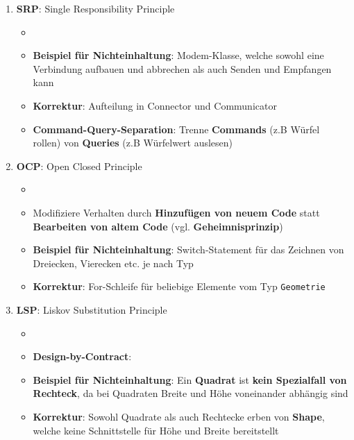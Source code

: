 \begin{enumerate}
	\item \textbf{SRP}: Single Responsibility Principle
	\begin{itemize}
		\item {}
		\item \textbf{Beispiel für Nichteinhaltung}: Modem-Klasse, welche sowohl eine Verbindung aufbauen und abbrechen als auch Senden und Empfangen kann
		\item \textbf{Korrektur}: Aufteilung in Connector und Communicator
		\item \textbf{Command-Query-Separation}: Trenne \textbf{Commands} (z.B Würfel rollen) von \textbf{Queries} (z.B Würfelwert auslesen)
	\end{itemize}
	\item \textbf{OCP}: Open Closed Principle
	\begin{itemize}
		\item {}
		\item Modifiziere Verhalten durch \textbf{Hinzufügen von neuem Code} statt \textbf{Bearbeiten von altem Code} (vgl. \textbf{Geheimnisprinzip})
		\item \textbf{Beispiel für Nichteinhaltung}: Switch-Statement für das Zeichnen von Dreiecken, Vierecken etc. je nach Typ
		\item \textbf{Korrektur}: For-Schleife für beliebige Elemente vom Typ \texttt{Geometrie}
	\end{itemize}
	\item \textbf{LSP}: Liskov Substitution Principle
	\begin{itemize}
		\item {}
		\item \textbf{Design-by-Contract}: 
		\item \textbf{Beispiel für Nichteinhaltung}: Ein \textbf{Quadrat} ist \textbf{kein Spezialfall von Rechteck}, da bei Quadraten Breite und Höhe voneinander abhängig sind
		\item \textbf{Korrektur}: Sowohl Quadrate als auch Rechtecke erben von \textbf{Shape}, welche keine Schnittstelle für Höhe und Breite bereitstellt

\end{itemize}
\end{enumerate}

